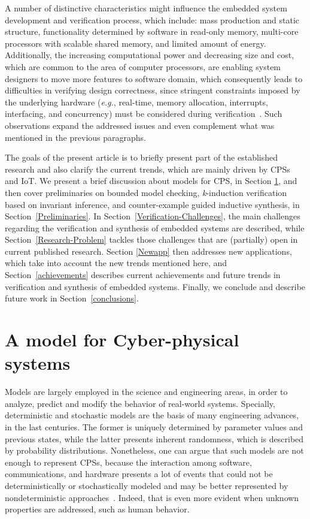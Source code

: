 \documentclass{acm_sen_article}
\begin{document}
A number of distinctive characteristics might influence the embedded system development and verification process, which include: mass production and static structure, functionality determined by software in read-only memory, multi-core processors with scalable shared memory, and limited amount of energy. Additionally, the increasing computational power and decreasing size and cost, which are common to the area of computer processors, are enabling system designers to move more features to software domain, which consequently leads to difficulties in verifying design correctness, since stringent constraints imposed by the underlying hardware ({\it e.g.}, real-time, memory allocation, interrupts, interfacing, and concurrency) must be considered during verification~\cite{Kroening15}. Such observations expand the addressed issues and even complement what was mentioned in the previous paragraphs.

The goals of the present article is to briefly present part of the established research and also clarify the current trends, which are mainly driven by CPSs and IoT. We present a brief discussion about models for CPS, in Section \ref{sec:model}, and then cover preliminaries on bounded model checking, \textit{k}-induction verification based on invariant inference, and counter-example guided inductive synthesis, in Section~\ref{Preliminaries}. In Section~\ref{Verification-Challenges}, the main challenges regarding the verification and synthesis of embedded systems are described, while Section~\ref{Research-Problem} tackles those challenges that are (partially) open in current published research. Section \ref{Newapp} then addresses new applications, which take into account the new trends mentioned here, and Section~\ref{achievements} describes current achievements and future trends in verification and synthesis of embedded systems. Finally, we conclude and describe future work in Section~\ref{conclusions}.

\section{A model for Cyber-physical systems}
\label{sec:model}

Models are largely employed in the science and engineering areas, in order to analyze, predict and modify the behavior of real-world systems. Specially, deterministic and stochastic models are the basis of many engineering advances, in the last centuries. The former is uniquely determined by parameter values and previous states, while the latter presents inherent randomness, which is described by probability distributions. Nonetheless, one can argue that such models are not enough to represent CPSs, because the interaction among software, communications, and hardware presents a lot of events that could not be deterministically or stochastically modeled and may be better represented by nondeterministic approaches~\cite{leeCPS2}. Indeed, that is even more evident when unknown properties are addressed, such as human behavior.
\end{document}
